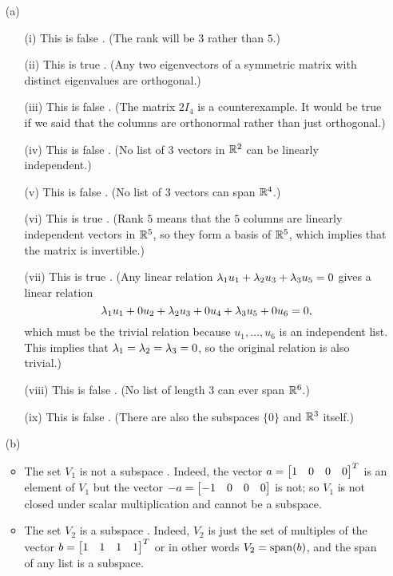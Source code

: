 \documentclass[a4paper]{article}
\begin{document}
\begin{solution}
 \begin{itemize}
  \item[(a)]
   \begin{itemize}
    \item[(i)] This is false \mk.  (The rank will be $3$ rather than
     $5$.) 
    \item[(ii)] This is true \mk.   (Any two eigenvectors of a
     symmetric matrix with distinct eigenvalues are orthogonal.)
    \item[(iii)] This is false \mk.  (The matrix $2I_4$ is a
     counterexample.  It would be true if we said that the columns are
     orthonormal rather than just orthogonal.)
    \item[(iv)] This is false \mk.  (No list of $3$ vectors in ${\mathbb{R}}^2$
     can be linearly independent.)
    \item[(v)] This is false \mk.  (No list of $3$ vectors can span
     ${\mathbb{R}}^4$.)
    \item[(vi)] This is true \mk. (Rank $5$ means that the $5$ columns
     are linearly independent vectors in ${\mathbb{R}}^5$, so they form a basis
     of ${\mathbb{R}}^5$, which implies that the matrix is invertible.)
    \item[(vii)] This is true \mk.  (Any linear relation
     $\lambda_1u_1+\lambda_2u_3+\lambda_3u_5=0$ gives a linear relation 
     \[ \lambda_1u_1+0u_2+\lambda_2u_3+0u_4+\lambda_3u_5+0u_6=0, \]
     which must be the trivial relation because $u_1,\dotsc,u_6$ is an
     independent list.  This implies that $\lambda_1=\lambda_2=\lambda_3=0$, so
     the original relation is also trivial.)
    \item[(viii)] This is false \mk. (No list of length $3$ can ever
     span ${\mathbb{R}}^6$.)
    \item[(ix)] This is false \mk. (There are also the subspaces
     $\{0\}$ and ${\mathbb{R}}^3$ itself.)
   \end{itemize}
  \item[(b)] 
   \begin{itemize}
    \item The set $V_1$ is not a subspace \mk.  Indeed, the
     vector $a=\left[\begin{matrix} 1&0&0&0\end{matrix}\right]^T$ is an element of $V_1$ but the
     vector $-a=\left[\begin{matrix} -1&0&0&0\end{matrix}\right]$ is not; so $V_1$ is not closed
     under scalar multiplication and cannot be a subspace. \mk 
    \item The set $V_2$ is a subspace \mk.  Indeed, $V_2$ is just the
     set of multiples of the vector $b=\left[\begin{matrix} 1&1&1&1\end{matrix}\right]^T$ or in other
     words $V_2=\operatorname{span}(b)$, and the span of any list is a subspace. \mk

\end{itemize}
\end{itemize}
\end{solution}
\end{document}
